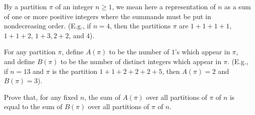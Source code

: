 By a partition $\pi$ of an integer $n\ge 1$,  we mean here a representation of $n$ as a sum of one or more positive integers where the summands must be put in nondecreasing order. (E.g., if $n=4$,  then the partitions $\pi$ are $1+1+1+1$,  $1+1+2$,  $1+3, 2+2$,  and $4$).

For any partition $\pi$,  define $A(\pi)$ to be the number of $1$'s which appear in $\pi$,  and define $B(\pi)$ to be the number of distinct integers which appear in $\pi$. (E.g., if $n=13$ and $\pi$ is the partition $1+1+2+2+2+5$,  then $A(\pi)=2$ and $B(\pi) = 3$).

Prove that, for any fixed $n$,  the sum of $A(\pi)$ over all partitions of $\pi$ of $n$ is equal to the sum of $B(\pi)$ over all partitions of $\pi$ of $n$.